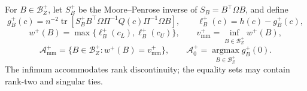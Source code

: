 For \(B\in\mathcal B_Z^+\), let \(S_B^+\) be the Moore--Penrose inverse of \(S_B=B^{\top}\Omega B\), and define
\[
 g_B^+(c)=n^{-2}\operatorname{tr}\!\left[S_B^+B^{\top}\Omega\Pi^{-1}Q(c)\Pi^{-1}\Omega B\right],
 \qquad \ell_B^+(c)=h(c)-g_B^+(c),
\]
\[
 w^+(B)=\max\{\ell_B^+(c_L),\ell_B^+(c_U)\},
 \qquad v_{\mathrm{mm}}^+=\inf_{B\in\mathcal B_Z^+}w^+(B),
\]
\[
 \mathcal A_{\mathrm{mm}}^+=\{B\in\mathcal B_Z^+:w^+(B)=v_{\mathrm{mm}}^+\},
 \qquad \mathcal A_0^+=\operatorname*{argmax}_{B\in\mathcal B_Z^+}g_B^+(0).
\]
The infimum accommodates rank discontinuity; the equality sets may contain rank-two and singular ties.